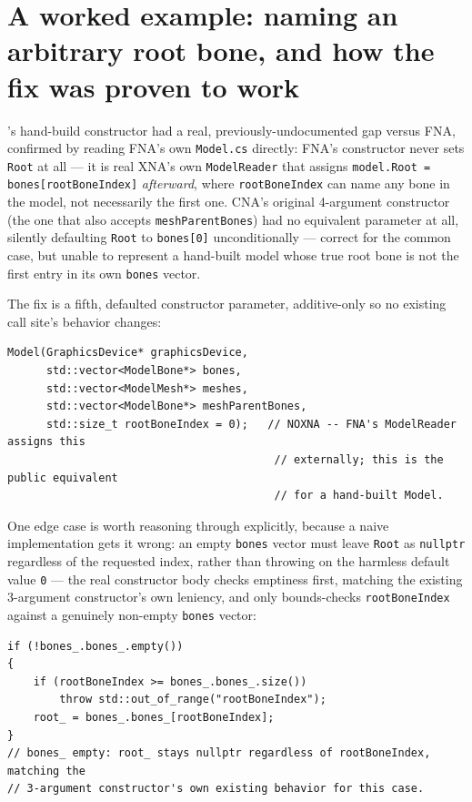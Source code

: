 \section[A worked example: naming an arbitrary root bone]{A worked example: naming an
arbitrary root bone, and how the fix was proven to work}

's hand-build constructor had a real, previously-undocumented gap versus FNA,
confirmed by reading FNA's own \texttt{Model.cs} directly: FNA's constructor never sets
\texttt{Root} at all --- it is real XNA's own \texttt{ModelReader} that assigns
\texttt{model.Root = bones[rootBoneIndex]} \emph{afterward}, where \texttt{rootBoneIndex} can
name any bone in the model, not necessarily the first one. CNA's original 4-argument
constructor (the one that also accepts \texttt{meshParentBones}) had no equivalent parameter at
all, silently defaulting \texttt{Root} to \texttt{bones[0]} unconditionally --- correct for the
common case, but unable to represent a hand-built model whose true root bone is not the first
entry in its own \texttt{bones} vector.

The fix is a fifth, defaulted constructor parameter, additive-only so no existing call site's
behavior changes:

\begin{lstlisting}
Model(GraphicsDevice* graphicsDevice,
      std::vector<ModelBone*> bones,
      std::vector<ModelMesh*> meshes,
      std::vector<ModelBone*> meshParentBones,
      std::size_t rootBoneIndex = 0);   // NOXNA -- FNA's ModelReader assigns this
                                         // externally; this is the public equivalent
                                         // for a hand-built Model.
\end{lstlisting}

One edge case is worth reasoning through explicitly, because a naive implementation gets it
wrong: an empty \texttt{bones} vector must leave \texttt{Root} as \texttt{nullptr} regardless of
the requested index, rather than throwing on the harmless default value \texttt{0} --- the real
constructor body checks emptiness first, matching the existing 3-argument constructor's own
leniency, and only bounds-checks \texttt{rootBoneIndex} against a genuinely non-empty
\texttt{bones} vector:

\begin{lstlisting}
if (!bones_.bones_.empty())
{
    if (rootBoneIndex >= bones_.bones_.size())
        throw std::out_of_range("rootBoneIndex");
    root_ = bones_.bones_[rootBoneIndex];
}
// bones_ empty: root_ stays nullptr regardless of rootBoneIndex, matching the
// 3-argument constructor's own existing behavior for this case.
\end{lstlisting}

